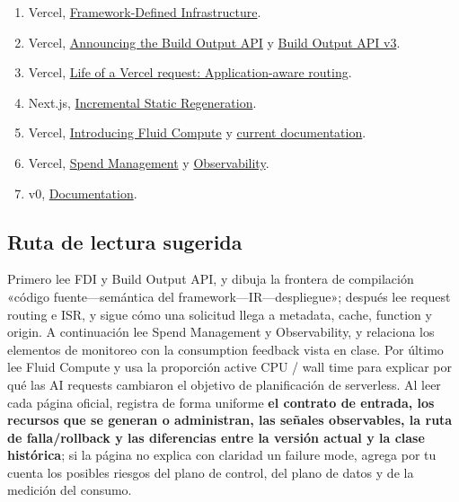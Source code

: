 \documentclass[a4paper]{article}
\begin{document}
\begin{enumerate}
  \item Vercel, \href{https://vercel.com/blog/framework-defined-infrastructure}{Framework-Defined Infrastructure}.
  \item Vercel, \href{https://vercel.com/blog/build-output-api}{Announcing the Build Output API} y \href{https://vercel.com/docs/build-output-api/v3}{Build Output API v3}.
  \item Vercel, \href{https://vercel.com/blog/life-of-a-request-application-aware-routing}{Life of a Vercel request: Application-aware routing}.
  \item Next.js, \href{https://nextjs.org/docs/app/guides/incremental-static-regeneration}{Incremental Static Regeneration}.
  \item Vercel, \href{https://vercel.com/blog/introducing-fluid-compute}{Introducing Fluid Compute} y \href{https://vercel.com/docs/fluid-compute}{current documentation}.
  \item Vercel, \href{https://vercel.com/docs/spend-management}{Spend Management} y \href{https://vercel.com/docs/observability}{Observability}.
  \item v0, \href{https://v0.app/docs}{Documentation}.
\end{enumerate}

\subsection{Ruta de lectura sugerida}

Primero lee FDI y Build Output API, y dibuja la frontera de compilación «código fuente—semántica del framework—IR—despliegue»; después lee request routing e ISR, y sigue cómo una solicitud llega a metadata, cache, function y origin. A continuación lee Spend Management y Observability, y relaciona los elementos de monitoreo con la consumption feedback vista en clase. Por último lee Fluid Compute y usa la proporción active CPU / wall time para explicar por qué las AI requests cambiaron el objetivo de planificación de serverless. Al leer cada página oficial, registra de forma uniforme \textbf{el contrato de entrada, los recursos que se generan o administran, las señales observables, la ruta de falla/rollback y las diferencias entre la versión actual y la clase histórica}; si la página no explica con claridad un failure mode, agrega por tu cuenta los posibles riesgos del plano de control, del plano de datos y de la medición del consumo.
\end{document}
